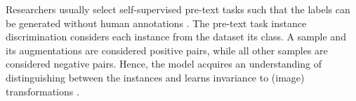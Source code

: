 Researchers usually select self-supervised pre-text tasks such that 
the labels can be generated without human annotations \citet{PIC_2020}.
The pre-text task instance discrimination considers each instance from the dataset its class.
A sample and its augmentations are considered positive pairs, 
while all other samples are considered negative pairs.
Hence, the model acquires an understanding of distinguishing between the instances and 
learns invariance to (image) transformations \citet{PIC_2020,swav_2020,local_aggr_2019,grape_2024,CL_temp_2021}.